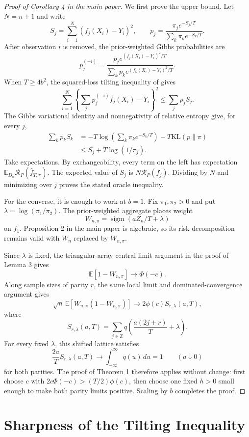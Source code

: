\documentclass[twoside]{article}
\newcommand{\E}{\mathbb E}
\newcommand{\R}{\mathcal R}
\newcommand{\sigm}{\operatorname{sigm}}
\begin{document}
\begin{proof}[Proof of Corollary 4 in the main paper]
We first prove the upper bound. Let $N=n+1$ and write
\[
S_j=\sum_{i=1}^N(f_j(X_i)-Y_i)^2,
\qquad
p_j=\frac{\pi_je^{-S_j/T}}{\sum_k\pi_ke^{-S_k/T}}.
\]
After observation $i$ is removed, the prior-weighted Gibbs probabilities are
\[
p_j^{(-i)}
=\frac{p_je^{(f_j(X_i)-Y_i)^2/T}}
{\sum_kp_ke^{(f_k(X_i)-Y_i)^2/T}}.
\]
When $T\geq4b^2$, the squared-loss tilting inequality of \citet{hogsgaard2026aggregation} gives
\[
\sum_{i=1}^N
\left\{\sum_jp_j^{(-i)}f_j(X_i)-Y_i\right\}^2
\leq\sum_jp_jS_j.
\]
The Gibbs variational identity and nonnegativity of relative entropy give, for every $j$,
\begin{align*}
\sum_kp_kS_k
&=-T\log\left(\sum_k\pi_ke^{-S_k/T}\right)-T\mathrm{KL}(p\|\pi)\\
&\leq S_j+T\log(1/\pi_j).
\end{align*}
Take expectations. By exchangeability, every term on the left has expectation $\E_{D_n}\R_P(\widehat f_{T,\pi})$. The expected value of $S_j$ is $N\R_P(f_j)$. Dividing by $N$ and minimizing over $j$ proves the stated oracle inequality.

For the converse, it is enough to work at $b=1$. Fix $\pi_1,\pi_2>0$ and put $\lambda=\log(\pi_1/\pi_2)$. The prior-weighted aggregate places weight
\[
W_{n,\pi}=\sigm(aZ_n/T+\lambda)
\]
on $f_1$. Proposition 2 in the main paper is algebraic, so its risk decomposition remains valid with $W_n$ replaced by $W_{n,\pi}$.

Since $\lambda$ is fixed, the triangular-array central limit argument in the proof of Lemma 3 gives
\[
\E[1-W_{n,\pi}]\longrightarrow\Phi(-c).
\]
Along sample sizes of parity $r$, the same local limit and dominated-convergence argument gives
\[
\sqrt n\,\E[W_{n,\pi}(1-W_{n,\pi})]
\longrightarrow2\phi(c)S_{r,\lambda}(a,T),
\]
where
\[
S_{r,\lambda}(a,T)=\sum_{j\in\mathbb Z}q\left(\frac{a(2j+r)}T+\lambda\right).
\]
For every fixed $\lambda$, this shifted lattice satisfies
\[
\frac{2a}{T}S_{r,\lambda}(a,T)\longrightarrow\int_{-\infty}^{\infty}q(u)\,du=1
\qquad(a\downarrow0)
\]
for both parities. The proof of Theorem 1 therefore applies without change: first choose $c$ with $2c\Phi(-c)>(T/2)\phi(c)$, then choose one fixed $h>0$ small enough to make both parity limits positive. Scaling by $b$ completes the proof.
\end{proof}

\section{Sharpness of the Tilting Inequality}
\end{document}
